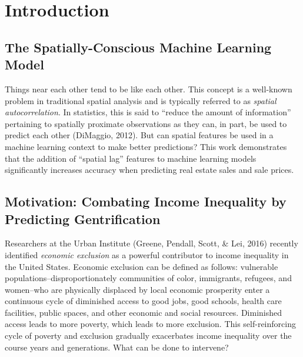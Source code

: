 \documentclass[12pt,]{article}
\begin{document}
\newpage
\normalsize
\singlespace
\tableofcontents
\doublespace
\newpage
{}

\pagestyle{plain}
\justify

\hypertarget{introduction}{%
\section{Introduction}\label{introduction}}

\hypertarget{the-spatially-conscious-machine-learning-model}{%
\subsection{The Spatially-Conscious Machine Learning
Model}\label{the-spatially-conscious-machine-learning-model}}

Things near each other tend to be like each other. This concept is a
well-known problem in traditional spatial analysis and is typically
referred to as \emph{spatial autocorrelation}. In statistics, this is
said to ``reduce the amount of information'' pertaining to spatially
proximate observations as they can, in part, be used to predict each
other (DiMaggio, 2012). But can spatial features be used in a machine
learning context to make better predictions? This work demonstrates that
the addition of ``spatial lag'' features to machine learning models
significantly increases accuracy when predicting real estate sales and
sale prices.

\hypertarget{motivation-combating-income-inequality-by-predicting-gentrification}{%
\subsection{Motivation: Combating Income Inequality by Predicting
Gentrification}\label{motivation-combating-income-inequality-by-predicting-gentrification}}

Researchers at the Urban Institute (Greene, Pendall, Scott, \& Lei,
2016) recently identified \emph{economic exclusion} as a powerful
contributor to income inequality in the United States. Economic
exclusion can be defined as follows: vulnerable
populations--disproportionately communities of color, immigrants,
refugees, and women--who are physically displaced by local economic
prosperity enter a continuous cycle of diminished access to good jobs,
good schools, health care facilities, public spaces, and other economic
and social resources. Diminished access leads to more poverty, which
leads to more exclusion. This self-reinforcing cycle of poverty and
exclusion gradually exacerbates income inequality over the course years
and generations. What can be done to intervene?
\end{document}
